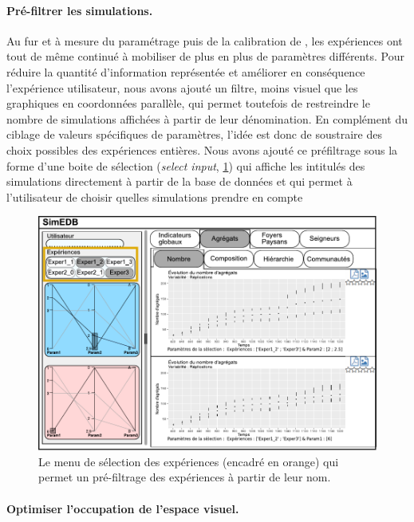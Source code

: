 \paragraph{Pré-filtrer les simulations.}

Au fur et à mesure du paramétrage puis de la calibration de \simfeodal{}, les expériences ont tout de même continué à mobiliser de plus en plus de paramètres différents.
Pour réduire la quantité d'information représentée et améliorer en conséquence \og l'expérience utilisateur\fg{}, nous avons ajouté un filtre, moins visuel que les graphiques en coordonnées parallèle, qui permet toutefois de restreindre le nombre de simulations affichées à partir de leur dénomination.
En complément du ciblage de valeurs spécifiques de paramètres, l'idée est donc de soustraire des choix possibles des expériences entières.
Nous avons ajouté ce préfiltrage sous la forme d'une \og boite de sélection (\textit{select input}, \cref{fig:simedb-prefilter}) qui affiche les intitulés des simulations directement à partir de la base de données et qui permet à l'utilisateur de choisir quelles simulations prendre en compte

\begin{figure}[H]
	\centering
	\includegraphics[width=\linewidth]{img/mockup_SimEDB_selectinput.pdf}
	\caption[Le menu de sélection des expériences.]{Le menu de sélection des expériences (encadré en orange) qui permet un pré-filtrage des expériences à partir de leur nom.}
	\label{fig:simedb-prefilter}
\end{figure}

\paragraph{Optimiser l'occupation de l'espace visuel.}\label{par:simedb-resize-parcoords}

